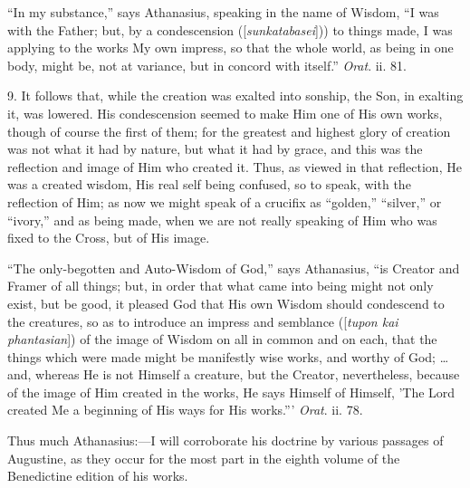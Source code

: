 ``In my substance,'' says Athanasius, speaking in the name
of Wisdom, ``I was with the Father; but, by a condescension ([\emph{sunkatabasei}]))
to things made, I was applying to the works My own impress, so that
the whole world, as being in one body, might be, not at variance, but
in concord with itself.'' \emph{Orat}. ii. 81.

9. It follows that, while the creation was exalted into sonship,
the Son, in exalting it, was lowered. His condescension seemed to make
Him one of His own works, though of course the first of them; for the
greatest and highest glory of creation was not what it had by nature,
but what it had by grace, and this was the reflection and image of Him
who created it. Thus, as viewed in that reflection, He was a created
wisdom, His real self being confused, so to speak, with the reflection
of Him; as now we might speak of a crucifix as ``golden,''
``silver,'' or ``ivory,'' and as being made, when we
are not really speaking of Him who was fixed to the Cross, but of His
image.

``The only-begotten and Auto-Wisdom of God,'' says
Athanasius, ``is Creator and Framer of all things; but, in order
that what came into being might not only exist, but be good, it
pleased God that His own Wisdom should condescend to the creatures, so
as to introduce an impress and semblance ([\emph{tupon kai phantasian}])
of the image of Wisdom on all in common and on each, that the things
which were made might be manifestly wise works, and worthy of God; …
and, whereas He is not Himself a creature, but the Creator,
nevertheless, because of the image of Him created in the works, He
says Himself of Himself, 'The Lord created Me a beginning of His ways
for His works.''' \emph{Orat}. ii. 78.

Thus much Athanasius:—I will corroborate his doctrine by various
passages of Augustine, as they occur for the most part in the eighth
volume of the Benedictine edition of his works.

